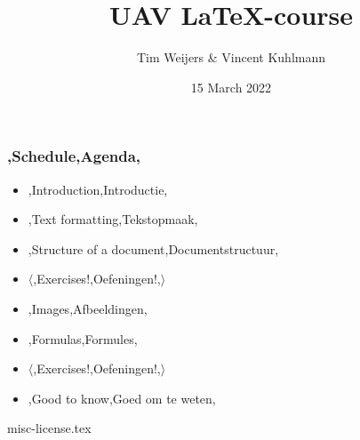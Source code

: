 \documentclass{../../cursuspresentatie}
\title{UAV \LaTeX{}-course}
\author{Tim Weijers \& Vincent Kuhlmann}
\date{15 March 2022}
\def\importslide#1#2{%
	{#2}
}
\begin{document}

\begin{frame}
	\titlepage
	\centering
\end{frame}

\begin{frame}
	\frametitle{\lang,Schedule,Agenda,}
	
	\begin{itemize}
		\item \lang,Introduction,Introductie,
		\item \lang,Text formatting,Tekstopmaak,
		\item \lang,Structure of a document,Documentstructuur,
		\item $ \langle $\lang,Exercises!,Oefeningen!,$ \rangle $
		\item \lang,Images,Afbeeldingen,
		\item \lang,Formulas,Formules,
		\item $ \mathbf\langle $\lang,Exercises!,Oefeningen!,$ \rangle $
		\item \lang,Good to know,Goed om te weten,
	\end{itemize}
\end{frame}











% 



\ifishandout
	\importslide{misc}{misc-license.tex}
\fi
	
\end{document}
